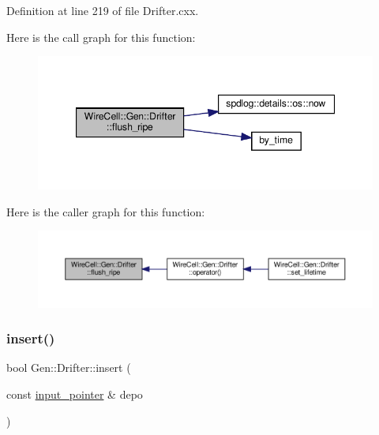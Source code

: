 Definition at line 219 of file Drifter.\+cxx.

Here is the call graph for this function\+:
\nopagebreak
\begin{figure}[H]
\begin{center}
\leavevmode
\includegraphics[width=347pt]{class_wire_cell_1_1_gen_1_1_drifter_adae5b8dde52b076da7ad8a9d3e3c2f29_cgraph}
\end{center}
\end{figure}
Here is the caller graph for this function\+:
\nopagebreak
\begin{figure}[H]
\begin{center}
\leavevmode
\includegraphics[width=350pt]{class_wire_cell_1_1_gen_1_1_drifter_adae5b8dde52b076da7ad8a9d3e3c2f29_icgraph}
\end{center}
\end{figure}
\mbox{\label{class_wire_cell_1_1_gen_1_1_drifter_a29fcb959e2873e8887595566a12dba7c}} 
\subsubsection{\texorpdfstring{insert()}{insert()}}
{\footnotesize\ttfamily bool Gen\+::\+Drifter\+::insert (\begin{DoxyParamCaption}\item[{const \hyperlink{class_wire_cell_1_1_i_queuedout_node_acf5f716a764553f3c7055a9cf67e906e}{input\+\_\+pointer} \&}]{depo }\end{DoxyParamCaption})}



